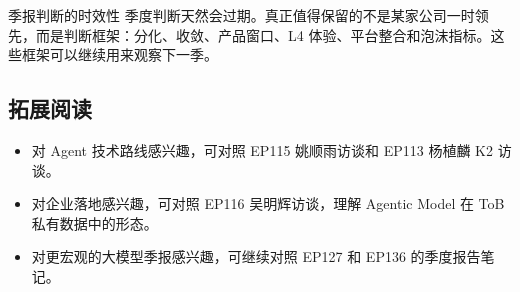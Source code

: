 \documentclass[a4paper]{article}
\begin{document}
\begin{warningbox}{季报判断的时效性}
季度判断天然会过期。真正值得保留的不是某家公司一时领先，而是判断框架：分化、收敛、产品窗口、L4 体验、平台整合和泡沫指标。这些框架可以继续用来观察下一季。
\end{warningbox}

\subsection{拓展阅读}

\begin{itemize}
\item 对 Agent 技术路线感兴趣，可对照 EP115 姚顺雨访谈和 EP113 杨植麟 K2 访谈。
\item 对企业落地感兴趣，可对照 EP116 吴明辉访谈，理解 Agentic Model 在 ToB 私有数据中的形态。
\item 对更宏观的大模型季报感兴趣，可继续对照 EP127 和 EP136 的季度报告笔记。
\end{itemize}
\end{document}
